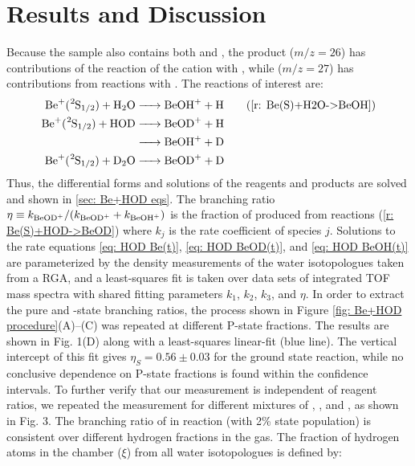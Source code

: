 \section{Results and Discussion}

Because the  sample also contains both  and , the product  ($m/z = 26$) has contributions of the reaction of the cation with , while  ($m/z = 27$) has contributions from reactions with . The reactions of interest are:
\begin{align}
	\ce{Be+(^2S1/2) + H2O & -> BeOH+ + H} \tag{\ref{r: Be(S)+H2O->BeOH}} \\
	\ce{Be+(^2S1/2) + HOD & -> BeOD+ + H} \label{r: Be(S)+HOD->BeOD} \\
	\ce{& -> BeOH+ + D} \label{r: Be(S)+HOD->BeOH} \\
	\ce{Be+(^2S1/2) + D2O & -> BeOD+ + D} \label{r: Be(S)+D2O->BeOD}
\end{align}
Thus, the differential forms and solutions of the reagents and products are solved and shown in \ref{sec: Be+HOD eqs}. The branching ratio $\eta \equiv k_{\ce{BeOD+}}/(k_{\ce{BeOD+}} + k_{\ce{BeOH+}})$ is the fraction of  produced from reactions (\ref{r: Be(S)+HOD->BeOD}) where $k_j$ is the rate coefficient of species $j$. Solutions to the rate equations \ref{eq: HOD Be(t)}, \ref{eq: HOD BeOD(t)}, and \ref{eq: HOD BeOH(t)} are parameterized by the density measurements of the water isotopologues taken from a RGA, and a least-squares fit is taken over data sets of integrated TOF mass spectra with shared fitting parameters $k_1$, $k_2$, $k_3$, and $\eta$. In order to extract the pure  and -state branching ratios, the process shown in Figure \ref{fig: Be+HOD procedure}(A)–(C) was repeated at different P-state fractions. The results are shown in Fig. 1(D) along with a least-squares linear-fit (blue line). The vertical intercept of this fit gives $\eta_S = 0.56 \pm 0.03$ for the ground  state reaction, while no conclusive dependence on P-state fractions is found within the confidence intervals. To further verify that our measurement is independent of reagent ratios, we repeated the measurement for different mixtures of , , and , as shown in Fig. 3. The branching ratio of  in reaction  (with 2\%  state population) is consistent over different hydrogen fractions in the gas. The fraction of hydrogen atoms in the chamber ($\xi$) from all water isotopologues is defined by:
